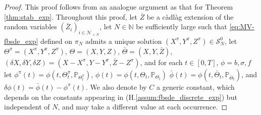 \documentclass[11pt]{article}
\numberwithin{equation}{section}
\theoremstyle{definition}
\theoremstyle{remark}
\def\cN{\mathcal{N}}
\def\cS{\mathcal{S}}
\def\sN{{\mathbb{N}}}
\def\sP{\mathbb{P}}
\begin{document}
\begin{proof}

This proof follows from an analogue argument as that for Theorem \ref{thm:stab_exp}.
Throughout this proof, 
let $\bar{Z}$ be a c\`{a}dl\`{a}g extension of the random variables $(\bar{Z}_i)_{i\in \cN_{<N}}$,
let $N\in \sN$ be  sufficiently large 
such that  \eqref{eq:MV-fbsde_exp} defined on $\pi_N$
admits a unique solution $(X^\pi,Y^\pi, Z^\pi)\in \cS^0_N$,
let ${\Theta}^\pi=({X}^\pi, {Y}^\pi, {Z}^\pi)$,
%
$\Theta=(X, Y, Z)$,  
$\bar{\Theta}=({X}, {Y}, \bar{Z})$,
$( \delta X,\delta Y, \delta Z)= (  X-{X}^\pi, Y-{Y}^\pi, \bar{Z}-{Z}^\pi)$,
and for each $t\in [0,T]$, $\phi=b, \sigma, f$
let ${\phi}^\pi(t)= \phi(t, {\Theta}^\pi_t,\sP_{{\Theta}^\pi_t})$,
${\phi}(t)= \phi(t, {\Theta}_t,\sP_{{\Theta}_t})$
$\bar{\phi}(t)= \phi(t, \bar{\Theta}_t,\sP_{\bar{\Theta}_t})$,
and 
$\delta {\phi}(t)=\bar{\phi}(t)- {\phi}^\pi(t)$.
We also denote by $C$ a generic constant, 
which
depends on the constants appearing in (H.\ref{assum:fbsde_discrete_exp})
but independent of $N$,
and  may take a different value at each occurrence.





\end{proof}
\end{document}
